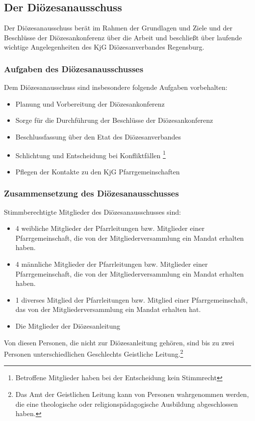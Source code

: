 \documentclass[12pt]{report}
\begin{document}
\begin{justify}
\subsection{Der Diözesanausschuss}
Der Diözesanausschuss berät im Rahmen der Grundlagen und Ziele und der Beschlüsse der Diözesankonferenz
über die Arbeit und beschließt über laufende wichtige Angelegenheiten des KjG Diözesanverbandes Regensburg.

\subsubsection{Aufgaben des Diözesanausschusses}
Dem Diözesanausschuss sind insbesondere folgende Aufgaben vorbehalten:
\begin{itemize}
  \item Planung und Vorbereitung der Diözesankonferenz
  \item Sorge für die Durchführung der Beschlüsse der Diözesankonferenz
  \item Beschlussfassung über den Etat des Diözesanverbandes
  \item Schlichtung und Entscheidung bei Konfliktfällen
        \footnote{Betroffene Mitglieder haben bei der Entscheidung kein Stimmrecht}
  \item Pflegen der Kontakte zu den KjG Pfarrgemeinschaften
\end{itemize}

\subsubsection{Zusammensetzung des Diözesanausschusses}
Stimmberechtigte Mitglieder des Diözesanausschusses sind:
\begin{itemize}
  \item 4 weibliche Mitglieder der Pfarrleitungen bzw. Mitglieder einer Pfarrgemeinschaft, die von der
        Mitgliederversammlung ein Mandat erhalten haben.
  \item 4 männliche Mitglieder der Pfarrleitungen bzw. Mitglieder einer Pfarrgemeinschaft, die von
        der Mitgliederversammlung ein Mandat erhalten haben.
  \item 1 diverses Mitglied der Pfarrleitungen bzw. Mitglied einer
  Pfarrgemeinschaft, das von der Mitgliederversammlung ein Mandat erhalten
  hat.
  \item Die Mitglieder der Diözesanleitung
\end{itemize}

Von diesen Personen, die nicht zur Diözesanleitung gehören, sind bis zu zwei
Personen unterschiedlichen Geschlechts Geistliche Leitung.\footnote{Das Amt der
  Geistlichen Leitung kann von Personen wahrgenommen werden, die
eine theologische oder religionspädagogische Ausbildung abgeschlossen haben.}


\end{justify}
\end{document}

